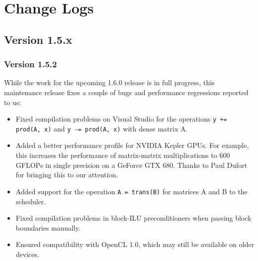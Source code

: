 
\chapter{Change Logs} %

\section*{Version 1.5.x}

\subsection*{Version 1.5.2}
While the work for the upcoming 1.6.0 release is in full progress, this maintenance release fixes a couple of bugs and performance regressions reported to us:
\begin{itemize}
 \item Fixed compilation problems on Visual Studio for the operations \lstinline|y += prod(A, x)| and \lstinline|y -= prod(A, x)| with dense matrix A.
 \item Added a better performance profile for NVIDIA Kepler GPUs. For example, this increases the performance of matrix-matrix multiplications to 600 GFLOPs in single precision on a GeForce GTX 680. Thanks to Paul Dufort for bringing this to our attention.
 \item Added support for the operation \lstinline|A = trans(B)| for matrices A and B to the scheduler.
 \item Fixed compilation problems in block-ILU preconditioners when passing block boundaries manually.
 \item Ensured compatibility with OpenCL 1.0, which may still be available on older devices.
\end{itemize}

